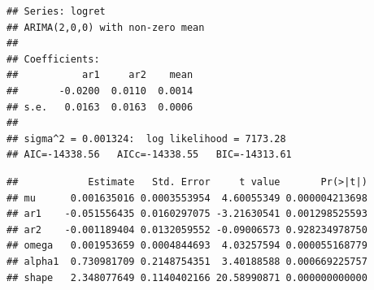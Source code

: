 \documentclass[
]{book}
\newenvironment{Shaded}{\begin{snugshade}}{\end{snugshade}}
\newcommand{\AttributeTok}[1]{\textcolor[rgb]{0.13,0.29,0.53}{#1}}
\newcommand{\CommentTok}[1]{\textcolor[rgb]{0.56,0.35,0.01}{\textit{#1}}}
\newcommand{\DecValTok}[1]{\textcolor[rgb]{0.00,0.00,0.81}{#1}}
\newcommand{\FunctionTok}[1]{\textcolor[rgb]{0.13,0.29,0.53}{\textbf{#1}}}
\newcommand{\NormalTok}[1]{#1}
\newcommand{\OtherTok}[1]{\textcolor[rgb]{0.56,0.35,0.01}{#1}}
\newcommand{\SpecialCharTok}[1]{\textcolor[rgb]{0.81,0.36,0.00}{\textbf{#1}}}
\newcommand{\StringTok}[1]{\textcolor[rgb]{0.31,0.60,0.02}{#1}}
\begin{document}
\begin{verbatim}
## Series: logret 
## ARIMA(2,0,0) with non-zero mean 
## 
## Coefficients:
##           ar1     ar2    mean
##       -0.0200  0.0110  0.0014
## s.e.   0.0163  0.0163  0.0006
## 
## sigma^2 = 0.001324:  log likelihood = 7173.28
## AIC=-14338.56   AICc=-14338.55   BIC=-14313.61
\end{verbatim}

\begin{Shaded}
\end{Shaded}

\begin{verbatim}
##            Estimate   Std. Error     t value       Pr(>|t|)
## mu      0.001635016 0.0003553954  4.60055349 0.000004213698
## ar1    -0.051556435 0.0160297075 -3.21630541 0.001298525593
## ar2    -0.001189404 0.0132059552 -0.09006573 0.928234978750
## omega   0.001953659 0.0004844693  4.03257594 0.000055168779
## alpha1  0.730981709 0.2148754351  3.40188588 0.000669225757
## shape   2.348077649 0.1140402166 20.58990871 0.000000000000
\end{verbatim}
\end{document}
